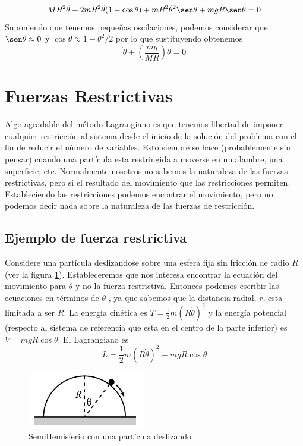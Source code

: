 \documentclass[12pt]{book}
\theoremstyle{definition}
\theoremstyle{remark}
\theoremstyle{plain}
\begin{document}
\begin{equation}
\label{equ242}
M R^2 \ddot{\theta}+ 2 m R^2 \ddot{\theta}(1-\cos \theta)+ m R^2 \dot{\theta}^2 \sen \theta+  m g R \sen \theta =0
\end{equation}
Suponiendo que tenemos pequeñas oscilaciones, podemos considerar que $\sen \theta \approx 0$ y $\cos \theta \approx 1 - \theta ^2/2$ por lo que sustituyendo obtenemos
\begin{equation}
\label{equ243}
\ddot{\theta} + \left ( \frac{m g}{M R} \right ) \theta =0
\end{equation}

\section{Fuerzas Restrictivas}
Algo agradable del método Lagrangiano es que tenemos libertad de imponer cualquier restricción al sistema desde el inicio de la solución del problema con el fin de reducir el número de variables. Esto siempre se hace (probablemente sin pensar) cuando una partícula esta restringida a moverse en un alambre, una superficie, etc. Normalmente nosotros no sabemos la naturaleza de las fuerzas restrictivas, pero si el resultado del movimiento que las restricciones permiten. Estableciendo las restricciones podemos encontrar el movimiento, pero no podemos decir nada sobre la naturaleza de las fuerzas de restricción.
\subsection{Ejemplo de fuerza restrictiva}
Considere una partícula deslizandose sobre una esfera fija sin fricción de radio $R$ (ver la figura \ref{fig9}). Estableceremos que nos interesa encontrar la ecuación del movimiento para $\theta$ y no la fuerza restrictiva. Entonces podemos escribir las ecuaciones en términos de $\theta$ , ya que sabemos que la distancia radial, $r$, esta limitada a ser $R$. La energía cinética es $T= \frac{1}{2} m (R \dot{\theta}) ^2$ y la energía potencial (respecto al sistema de referencia que esta en el centro de la parte inferior) es $V=m g R \cos \theta$. El Lagrangiano es
\begin{equation}
\label{equ223}
L =  \frac{1}{2} m (R \dot{\theta}) ^2 -m g R \cos \theta
\end{equation}

\begin{figure}
\centering
\includegraphics[width=2in]{hemisferio.jpg}
\caption{SemiHemisferio con una partícula deslizando}
\label{fig9}
\end{figure}
\end{document}
